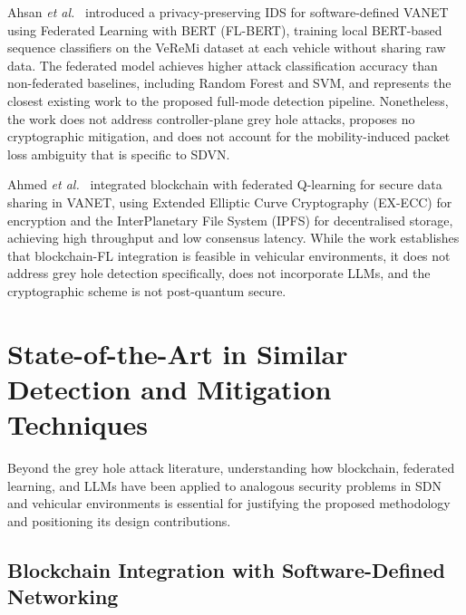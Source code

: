 \documentclass[12pt, a4paper]{report}
\begin{document}
Ahsan \textit{et al.}~\cite{ahsan2024flbert} introduced a privacy-preserving
IDS for software-defined VANET using Federated Learning with BERT (FL-BERT),
training local BERT-based sequence classifiers on the VeReMi dataset at each
vehicle without sharing raw data. The federated model achieves higher attack
classification accuracy than non-federated baselines, including Random Forest
and SVM, and represents the closest existing work to the proposed full-mode
detection pipeline. Nonetheless, the work does not address controller-plane grey
hole attacks, proposes no cryptographic mitigation, and does not account for
the mobility-induced packet loss ambiguity that is specific to SDVN.

Ahmed \textit{et al.}~\cite{ahmed2024blockchain} integrated blockchain with
federated Q-learning for secure data sharing in VANET, using Extended Elliptic
Curve Cryptography (EX-ECC) for encryption and the InterPlanetary File System
(IPFS) for decentralised storage, achieving high throughput and low consensus
latency. While the work establishes that blockchain-FL integration is feasible
in vehicular environments, it does not address grey hole detection specifically,
does not incorporate LLMs, and the cryptographic scheme is not post-quantum
secure.


\section{State-of-the-Art in Similar Detection and Mitigation Techniques}
\label{sec:lit_techniques}

Beyond the grey hole attack literature, understanding how blockchain,
federated learning, and LLMs have been applied to analogous security
problems in SDN and vehicular environments is essential for justifying
the proposed methodology and positioning its design contributions.

\subsection{Blockchain Integration with Software-Defined Networking}
\label{sec:lit_blockchain_sdn}
\end{document}
